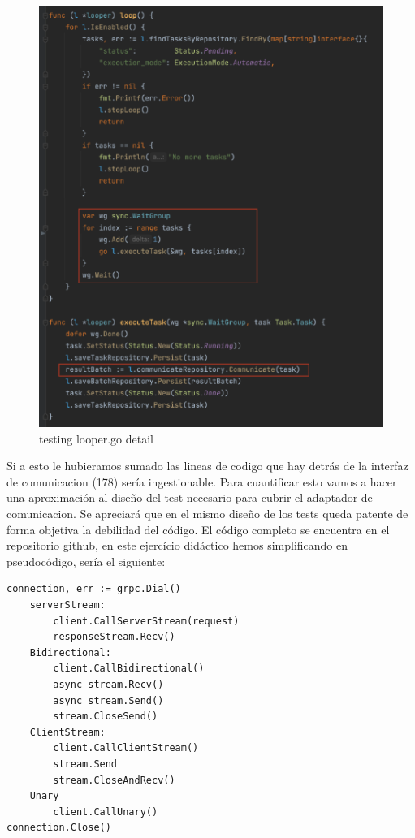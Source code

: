 \begin{figure}[h]
    \centering
    \includegraphics[height=0.5\textheight]{./part/Ejecucion/Seguimiento/Testing/img/Looper}
    \caption{testing looper.go detail}\label{fig:testingLooper}
\end{figure}

Si a esto le hubieramos sumado las lineas de codigo que hay detrás de la interfaz de comunicacion (178) sería ingestionable. Para cuantificar esto vamos a hacer una aproximación al diseño del test necesario para cubrir el adaptador de comunicacion. Se apreciará que en el mismo diseño de los tests queda patente de forma objetiva la debilidad del código. El código completo se encuentra en el repositorio github, en este ejercício didáctico hemos simplificando en pseudocódigo, sería el siguiente:

\begin{verbatim}
connection, err := grpc.Dial()
    serverStream:
        client.CallServerStream(request)
        responseStream.Recv()
    Bidirectional:
        client.CallBidirectional()
        async stream.Recv()
        async stream.Send()
        stream.CloseSend()
    ClientStream:
        client.CallClientStream()
        stream.Send
        stream.CloseAndRecv()
    Unary
        client.CallUnary()
connection.Close()
\end{verbatim}


